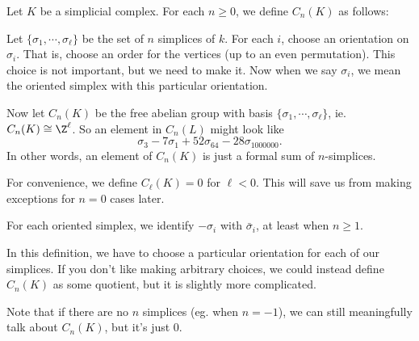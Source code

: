 \documentclass[a4paper]{article}
\begin{document}
\begin{defi}
  Let $K$ be a simplicial complex. For each $n \geq 0$, we define $C_n(K)$ as follows:

  Let $\{\sigma_1, \cdots, \sigma_\ell\}$ be the set of $n$ simplices of $k$. For each $i$, choose an orientation on $\sigma_i$. That is, choose an order for the vertices (up to an even permutation). This choice is not important, but we need to make it. Now when we say $\sigma_i$, we mean the oriented simplex with this particular orientation.

  Now let $C_n(K)$ be the free abelian group with basis $\{\sigma_1, \cdots, \sigma_\ell\}$, ie. $C_n(K) \cong \Z^\ell$. So an element in $C_n(L)$ might look like
  \[
    \sigma_3 - 7 \sigma_1 + 52 \sigma_{64} - 28 \sigma_{1000000}.
  \]
  In other words, an element of $C_n(K)$ is just a formal sum of $n$-simplices.

  For convenience, we define $C_{\ell}(K) = 0$ for $\ell < 0$. This will save us from making exceptions for $n = 0$ cases later.
\end{defi}
For each oriented simplex, we identify $-\sigma_i$ with $\bar{\sigma}_i$, at least when $n \geq 1$.

In this definition, we have to choose a particular orientation for each of our simplices. If you don't like making arbitrary choices, we could instead define $C_n(K)$ as some quotient, but it is slightly more complicated.

Note that if there are no $n$ simplices (eg. when $n = -1$), we can still meaningfully talk about $C_n(K)$, but it's just $0$.
\end{document}
